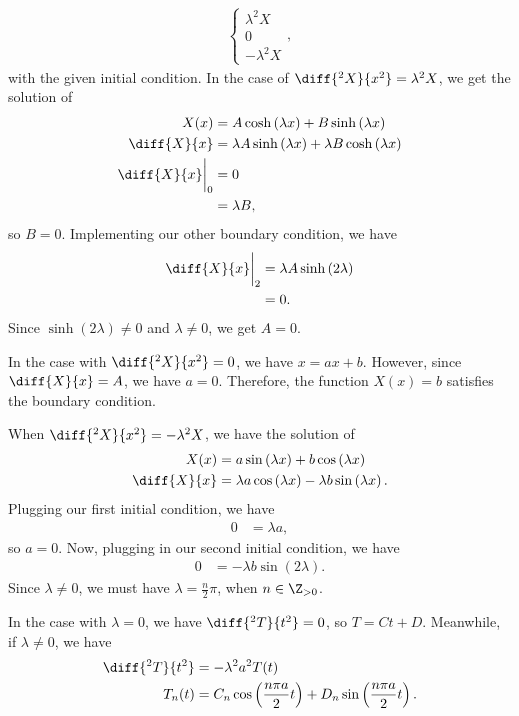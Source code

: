 \documentclass[10pt]{mypackage}
\begin{document}
\begin{example}
\begin{align*}
\begin{cases}
      \lambda^2 X\\ 0 \\ -\lambda^2 X
    \end{cases},
  \end{align*}
  with the given initial condition. In the case of $\diff{^2X}{x^2} = \lambda^2 X$, we get the solution of
  \begin{align*}
    X(x) &= A\cosh\left( \lambda x \right) + B\sinh\left( \lambda x \right)\\
    \diff{X}{x} &= \lambda A \sinh\left( \lambda x \right) + \lambda B\cosh\left( \lambda x \right)\\
    \diff{X}{x}\biggr\vert_{0} &= 0\\
                               &= \lambda B,
  \end{align*}
  so $B = 0$. Implementing our other boundary condition, we have
  \begin{align*}
    \diff{X}{x}\biggr\vert_{2} &= \lambda A \sinh\left( 2\lambda \right)\\
                               &= 0.
  \end{align*}
  Since $\sinh(2\lambda)\neq 0$ and $\lambda\neq 0$, we get $A = 0$.\newline

  In the case with $\diff{^2X}{x^2} = 0$, we have $x = ax + b$. However, since $\diff{X}{x} = A$, we have $a = 0$. Therefore, the function $X(x) = b$ satisfies the boundary condition.\newline

  When $\diff{^2 X}{x^2} = -\lambda^2 X$, we have the solution of
  \begin{align*}
    X(x) &= a\sin\left( \lambda x \right) + b\cos\left( \lambda x \right)\\
    \diff{X}{x} &= \lambda a\cos\left( \lambda x \right) - \lambda b \sin\left( \lambda x \right).
  \end{align*}
  Plugging our first initial condition, we have
  \begin{align*}
    0 &= \lambda a,
  \end{align*}
  so $a = 0$. Now, plugging in our second initial condition, we have
  \begin{align*}
    0 &= -\lambda b \sin\left( 2\lambda \right).
  \end{align*}
  Since $\lambda\neq 0$, we must have $\lambda = \frac{n}{2}\pi$, when $n\in \Z_{>0}$.\newline

  In the case with $\lambda = 0$, we have $\diff{^2T}{t^2} = 0$, so $T = Ct + D$. Meanwhile, if $\lambda\neq 0$, we have
  \begin{align*}
    \diff{^2 T}{t^2} &= -\lambda^2 a^2 T(t)\\
    T_n(t) &= C_n\cos\left( \frac{n\pi a}{2} t \right) + D_n \sin\left( \frac{n\pi a}{2}t \right).
  \end{align*}
  
\end{example}
\end{document}
